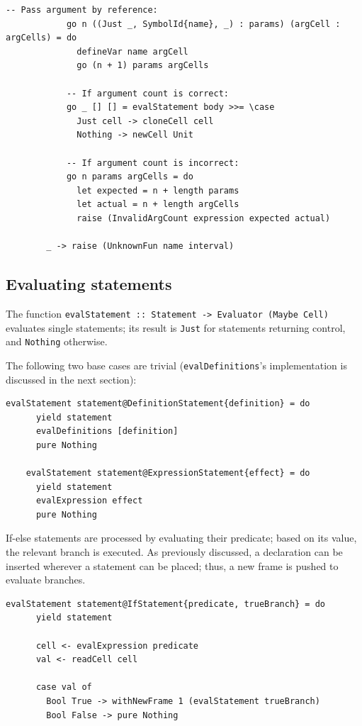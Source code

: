 \documentclass[UdineBachThesis,american,11pt]{PhdThesis}
\begin{document}
  \pagebreak

  \begin{Verbatim}[gobble=4,fontsize=\small]
            -- Pass argument by reference:
            go n ((Just _, SymbolId{name}, _) : params) (argCell : argCells) = do
              defineVar name argCell
              go (n + 1) params argCells

            -- If argument count is correct:
            go _ [] [] = evalStatement body >>= \case
              Just cell -> cloneCell cell
              Nothing -> newCell Unit

            -- If argument count is incorrect:
            go n params argCells = do
              let expected = n + length params
              let actual = n + length argCells
              raise (InvalidArgCount expression expected actual)

        _ -> raise (UnknownFun name interval)
  \end{Verbatim}

  \subsection{Evaluating statements}

  The function
  \mbox{\texttt{evalStatement :: Statement -> Evaluator (Maybe Cell)}} evaluates
  single statements; its result is \mbox{\texttt{Just}} for statements returning
  control, and \mbox{\texttt{Nothing}} otherwise.

  The following two base cases are trivial (\mbox{\texttt{evalDefinitions}}'s
  implementation is discussed in the next section):

  \begin{Verbatim}[gobble=4,fontsize=\small]
    evalStatement statement@DefinitionStatement{definition} = do
      yield statement
      evalDefinitions [definition]
      pure Nothing

    evalStatement statement@ExpressionStatement{effect} = do
      yield statement
      evalExpression effect
      pure Nothing
  \end{Verbatim}

  If-else statements are processed by evaluating their predicate; based on its
  value, the relevant branch is executed. As previously discussed, a declaration
  can be inserted wherever a statement can be placed; thus, a new frame is
  pushed to evaluate branches.

  \begin{Verbatim}[gobble=4,fontsize=\small]
    evalStatement statement@IfStatement{predicate, trueBranch} = do
      yield statement

      cell <- evalExpression predicate
      val <- readCell cell

      case val of
        Bool True -> withNewFrame 1 (evalStatement trueBranch)
        Bool False -> pure Nothing
  \end{Verbatim}
\end{document}
